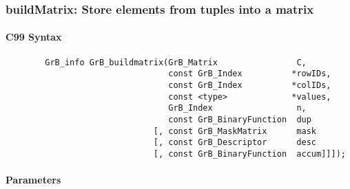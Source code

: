 \subsubsection{{\sf buildMatrix}: Store elements from tuples into a matrix}


\paragraph{C99 Syntax}

\begin{verbatim}
        GrB_info GrB_buildmatrix(GrB_Matrix                C,
                                 const GrB_Index          *rowIDs,
                                 const GrB_Index          *colIDs, 
                                 const <type>             *values,
                                 GrB_Index                 n,
                                 const GrB_BinaryFunction  dup
                              [, const GrB_MaskMatrix      mask
                              [, const GrB_Descriptor      desc
                              [, const GrB_BinaryFunction  accum]]]);
\end{verbatim}

\paragraph{Parameters}

